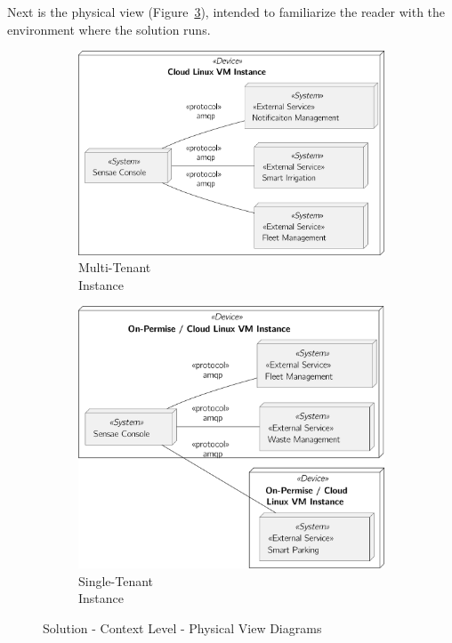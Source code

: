 Next is the physical view (Figure~\ref{fig:design:architecture:context:physical:diagram}), intended to familiarize the reader with the environment where the solution runs.

\begin{figure}[H]
   \centering
   \begin{subfigure}[b]{0.45\textwidth}
       \centering
       \includegraphics[page=1,width=\columnwidth]{assets/diagrams/design/architectural/level1/physical-view-multi-tenant.pdf}
       \caption{Multi-Tenant\\ Instance}
       \label{fig:design:architecture:context:physical:diagram:multi}
   \end{subfigure}
   \hfill
   \begin{subfigure}[b]{0.45\textwidth}
       \centering
       \includegraphics[page=1,width=\columnwidth]{assets/diagrams/design/architectural/level1/physical-view-single-tenant.pdf}
       \caption{Single-Tenant\\ Instance}
       \label{fig:design:architecture:context:physical:diagram:single}
   \end{subfigure}
      \caption[Solution - Context Level - Physical View Diagrams]{Solution - Context Level - Physical View Diagrams}
      \label{fig:design:architecture:context:physical:diagram}
\end{figure}

